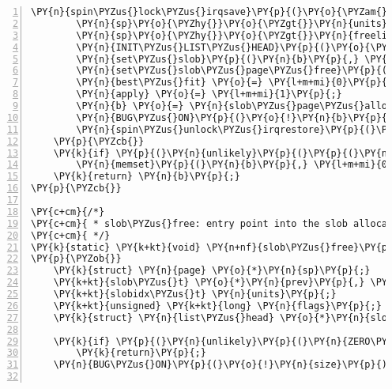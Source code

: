 \begin{Verbatim}[commandchars=\\\{\},numbers=left,firstnumber=1,stepnumber=1]
		\PY{n}{spin\PYZus{}lock\PYZus{}irqsave}\PY{p}{(}\PY{o}{\PYZam{}}\PY{n}{slob\PYZus{}lock}\PY{p}{,} \PY{n}{flags}\PY{p}{)}\PY{p}{;}
		\PY{n}{sp}\PY{o}{\PYZhy{}}\PY{o}{\PYZgt{}}\PY{n}{units} \PY{o}{=} \PY{n}{SLOB\PYZus{}UNITS}\PY{p}{(}\PY{n}{PAGE\PYZus{}SIZE}\PY{p}{)}\PY{p}{;}
		\PY{n}{sp}\PY{o}{\PYZhy{}}\PY{o}{\PYZgt{}}\PY{n}{freelist} \PY{o}{=} \PY{n}{b}\PY{p}{;}
		\PY{n}{INIT\PYZus{}LIST\PYZus{}HEAD}\PY{p}{(}\PY{o}{\PYZam{}}\PY{n}{sp}\PY{o}{\PYZhy{}}\PY{o}{\PYZgt{}}\PY{n}{list}\PY{p}{)}\PY{p}{;}
		\PY{n}{set\PYZus{}slob}\PY{p}{(}\PY{n}{b}\PY{p}{,} \PY{n}{SLOB\PYZus{}UNITS}\PY{p}{(}\PY{n}{PAGE\PYZus{}SIZE}\PY{p}{)}\PY{p}{,} \PY{n}{b} \PY{o}{+} \PY{n}{SLOB\PYZus{}UNITS}\PY{p}{(}\PY{n}{PAGE\PYZus{}SIZE}\PY{p}{)}\PY{p}{)}\PY{p}{;}
		\PY{n}{set\PYZus{}slob\PYZus{}page\PYZus{}free}\PY{p}{(}\PY{n}{sp}\PY{p}{,} \PY{n}{slob\PYZus{}list}\PY{p}{)}\PY{p}{;}
		\PY{n}{best\PYZus{}fit} \PY{o}{=} \PY{l+m+mi}{0}\PY{p}{;}
		\PY{n}{apply} \PY{o}{=} \PY{l+m+mi}{1}\PY{p}{;}
		\PY{n}{b} \PY{o}{=} \PY{n}{slob\PYZus{}page\PYZus{}alloc}\PY{p}{(}\PY{n}{sp}\PY{p}{,} \PY{n}{size}\PY{p}{,} \PY{n}{align}\PY{p}{,} \PY{n}{apply}\PY{p}{,} \PY{o}{\PYZam{}}\PY{n}{best\PYZus{}fit}\PY{p}{)}\PY{p}{;}
		\PY{n}{BUG\PYZus{}ON}\PY{p}{(}\PY{o}{!}\PY{n}{b}\PY{p}{)}\PY{p}{;}
		\PY{n}{spin\PYZus{}unlock\PYZus{}irqrestore}\PY{p}{(}\PY{o}{\PYZam{}}\PY{n}{slob\PYZus{}lock}\PY{p}{,} \PY{n}{flags}\PY{p}{)}\PY{p}{;}
	\PY{p}{\PYZcb{}}
	\PY{k}{if} \PY{p}{(}\PY{n}{unlikely}\PY{p}{(}\PY{p}{(}\PY{n}{gfp} \PY{o}{\PYZam{}} \PY{n}{\PYZus{}\PYZus{}GFP\PYZus{}ZERO}\PY{p}{)} \PY{o}{\PYZam{}}\PY{o}{\PYZam{}} \PY{n}{b}\PY{p}{)}\PY{p}{)}
		\PY{n}{memset}\PY{p}{(}\PY{n}{b}\PY{p}{,} \PY{l+m+mi}{0}\PY{p}{,} \PY{n}{size}\PY{p}{)}\PY{p}{;}
	\PY{k}{return} \PY{n}{b}\PY{p}{;}
\PY{p}{\PYZcb{}}

\PY{c+cm}{/*}
\PY{c+cm}{ * slob\PYZus{}free: entry point into the slob allocator.}
\PY{c+cm}{ */}
\PY{k}{static} \PY{k+kt}{void} \PY{n+nf}{slob\PYZus{}free}\PY{p}{(}\PY{k+kt}{void} \PY{o}{*}\PY{n}{block}\PY{p}{,} \PY{k+kt}{int} \PY{n}{size}\PY{p}{)}
\PY{p}{\PYZob{}}
	\PY{k}{struct} \PY{n}{page} \PY{o}{*}\PY{n}{sp}\PY{p}{;}
	\PY{k+kt}{slob\PYZus{}t} \PY{o}{*}\PY{n}{prev}\PY{p}{,} \PY{o}{*}\PY{n}{next}\PY{p}{,} \PY{o}{*}\PY{n}{b} \PY{o}{=} \PY{p}{(}\PY{k+kt}{slob\PYZus{}t} \PY{o}{*}\PY{p}{)}\PY{n}{block}\PY{p}{;}
	\PY{k+kt}{slobidx\PYZus{}t} \PY{n}{units}\PY{p}{;}
	\PY{k+kt}{unsigned} \PY{k+kt}{long} \PY{n}{flags}\PY{p}{;}
	\PY{k}{struct} \PY{n}{list\PYZus{}head} \PY{o}{*}\PY{n}{slob\PYZus{}list}\PY{p}{;}

	\PY{k}{if} \PY{p}{(}\PY{n}{unlikely}\PY{p}{(}\PY{n}{ZERO\PYZus{}OR\PYZus{}NULL\PYZus{}PTR}\PY{p}{(}\PY{n}{block}\PY{p}{)}\PY{p}{)}\PY{p}{)}
		\PY{k}{return}\PY{p}{;}
	\PY{n}{BUG\PYZus{}ON}\PY{p}{(}\PY{o}{!}\PY{n}{size}\PY{p}{)}\PY{p}{;}


\end{Verbatim}
